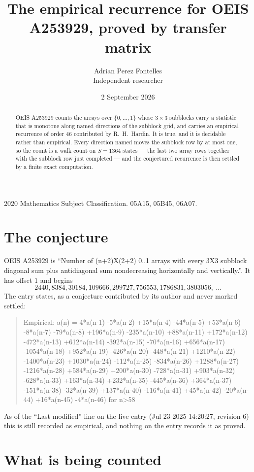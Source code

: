 \documentclass[11pt,a4paper]{article}
\title{The empirical recurrence for OEIS A253929, proved by transfer matrix}
\author{Adrian Perez Fontelles\\ \small Independent researcher}
\date{2 September 2026}
\theoremstyle{plain}
\theoremstyle{definition}
\begin{document}
\maketitle

\begin{abstract}
OEIS A253929 counts the arrays over $\{0,\dots,1\}$ whose $3\times3$ subblocks carry a
statistic that is monotone along named directions of the subblock grid, and carries an
empirical recurrence of order $46$ contributed by R.~H.~Hardin. It is true, and it is
decidable rather than empirical. Every direction named moves the subblock row by at most one,
so the count is a walk count on $S=1364$ states --- the last two array rows together with the
subblock row just completed --- and the conjectured recurrence is then settled by a finite
exact computation.
\end{abstract}

\noindent\small 2020 Mathematics Subject Classification. 05A15, 05B45, 06A07.\normalsize

\section{The conjecture}

OEIS A253929 is ``Number of (n+2)X(2+2) 0..1 arrays with every 3X3 subblock diagonal sum plus antidiagonal sum nondecreasing horizontally and vertically.''. It has offset $1$ and begins
\[
2440, 8384, 30184, 109666, 299727, 756553, 1786831, 3803056,\ \dots
\]
The entry states, as a conjecture contributed by its author and never marked settled:
\begin{quote}
Empirical: a(n) = 4*a(n-1) -5*a(n-2) +15*a(n-4) -44*a(n-5) +53*a(n-6) -8*a(n-7) -79*a(n-8) +196*a(n-9) -235*a(n-10) +88*a(n-11) +172*a(n-12) -472*a(n-13) +612*a(n-14) -392*a(n-15) -70*a(n-16) +656*a(n-17) -1054*a(n-18) +952*a(n-19) -426*a(n-20) -448*a(n-21) +1210*a(n-22) -1400*a(n-23) +1030*a(n-24) -112*a(n-25) -834*a(n-26) +1288*a(n-27) -1216*a(n-28) +584*a(n-29) +200*a(n-30) -728*a(n-31) +903*a(n-32) -628*a(n-33) +163*a(n-34) +232*a(n-35) -445*a(n-36) +364*a(n-37) -151*a(n-38) -32*a(n-39) +137*a(n-40) -116*a(n-41) +45*a(n-42) -20*a(n-44) +16*a(n-45) -4*a(n-46) for n>58
\end{quote}
As of the ``Last modified'' line on the live entry (Jul 23 2025 14:20:27, revision 6) this is still
recorded as empirical, and nothing on the entry records it as proved.

\section{What is being counted}
\end{document}
